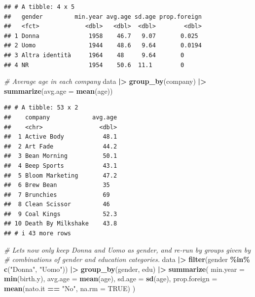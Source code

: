 \documentclass[
]{book}
\newenvironment{Shaded}{\begin{snugshade}}{\end{snugshade}}
\newcommand{\AttributeTok}[1]{\textcolor[rgb]{0.13,0.29,0.53}{#1}}
\newcommand{\CommentTok}[1]{\textcolor[rgb]{0.56,0.35,0.01}{\textit{#1}}}
\newcommand{\ConstantTok}[1]{\textcolor[rgb]{0.56,0.35,0.01}{#1}}
\newcommand{\FunctionTok}[1]{\textcolor[rgb]{0.13,0.29,0.53}{\textbf{#1}}}
\newcommand{\NormalTok}[1]{#1}
\newcommand{\SpecialCharTok}[1]{\textcolor[rgb]{0.81,0.36,0.00}{\textbf{#1}}}
\newcommand{\StringTok}[1]{\textcolor[rgb]{0.31,0.60,0.02}{#1}}
\begin{document}
\begin{verbatim}
## # A tibble: 4 x 5
##   gender         min.year avg.age sd.age prop.foreign
##   <fct>             <dbl>   <dbl>  <dbl>        <dbl>
## 1 Donna              1958    46.7   9.07       0.025 
## 2 Uomo               1944    48.6   9.64       0.0194
## 3 Altra identità     1964    48     9.64       0     
## 4 NR                 1954    50.6  11.1        0
\end{verbatim}

\begin{Shaded}
\begin{Highlighting}[]
\CommentTok{\# Average age in each company}
\NormalTok{data }\SpecialCharTok{|\textgreater{}} 
  \FunctionTok{group\_by}\NormalTok{(company) }\SpecialCharTok{|\textgreater{}} 
  \FunctionTok{summarize}\NormalTok{(}\AttributeTok{avg.age =} \FunctionTok{mean}\NormalTok{(age))}
\end{Highlighting}
\end{Shaded}

\begin{verbatim}
## # A tibble: 53 x 2
##    company            avg.age
##    <chr>                <dbl>
##  1 Active Body           48.1
##  2 Art Fade              44.2
##  3 Bean Morning          50.1
##  4 Beep Sports           43.1
##  5 Bloom Marketing       47.2
##  6 Brew Bean             35  
##  7 Brunchies             69  
##  8 Clean Scissor         46  
##  9 Coal Kings            52.3
## 10 Death By Milkshake    43.8
## # i 43 more rows
\end{verbatim}

\begin{Shaded}
\begin{Highlighting}[]
\CommentTok{\# Let\textquotesingle{}s now only keep Donna and Uomo as gender, and re{-}run by groups given by }
\CommentTok{\# combinations of gender and education categories.}
\NormalTok{data }\SpecialCharTok{|\textgreater{}} 
  \FunctionTok{filter}\NormalTok{(gender }\SpecialCharTok{\%in\%} \FunctionTok{c}\NormalTok{(}\StringTok{"Donna"}\NormalTok{, }\StringTok{"Uomo"}\NormalTok{)) }\SpecialCharTok{|\textgreater{}} 
  \FunctionTok{group\_by}\NormalTok{(gender, edu) }\SpecialCharTok{|\textgreater{}} 
  \FunctionTok{summarize}\NormalTok{(}
    \AttributeTok{min.year =} \FunctionTok{min}\NormalTok{(birth.y),}
    \AttributeTok{avg.age =} \FunctionTok{mean}\NormalTok{(age),}
    \AttributeTok{sd.age =} \FunctionTok{sd}\NormalTok{(age),}
    \AttributeTok{prop.foreign =} \FunctionTok{mean}\NormalTok{(nato.it }\SpecialCharTok{==} \StringTok{"No"}\NormalTok{, }\AttributeTok{na.rm =} \ConstantTok{TRUE}\NormalTok{)}
\NormalTok{  )}
\end{Highlighting}
\end{Shaded}
\end{document}
